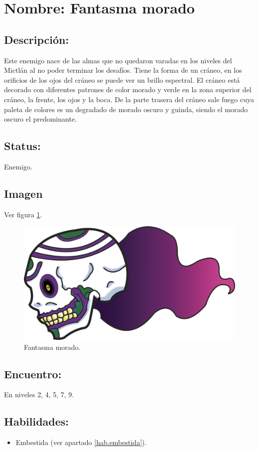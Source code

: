 \section{Nombre: Fantasma morado}   \label{per:fantasmaM}
\subsection{Descripción:}
Este enemigo nace de las almas que no quedaron varadas en los niveles del Mictlán al no poder terminar los desafíos. Tiene la forma de un cráneo, en los orificios de los ojos del cráneo se puede ver un brillo espectral. El cráneo está decorado con diferentes patrones de color morado y verde en la zona superior del cráneo, la frente, los ojos y la boca. De la parte trasera del cráneo sale fuego cuya paleta de colores es un degradado de morado oscuro y guinda, siendo el morado oscuro el predominante.  
\subsection{Status:}
Enemigo.
\subsection{Imagen}
Ver figura \ref{fig:fantasmaM}.
\begin{figure}
	\centering
	\includegraphics[height=0.2 \textheight]{Imagenes/fantasmaMorado}
	\caption{Fantasma morado.}
	\label{fig:fantasmaM}
\end{figure}
\subsection{Encuentro:}
En niveles 2, 4, 5, 7, 9.
\subsection{Habilidades:}
\begin{itemize}
	\item Embestida (ver apartado \ref{hab.embestida}).
	
\end{itemize}
